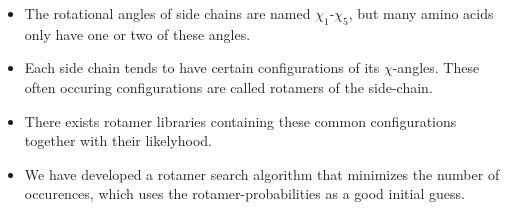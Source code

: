 \documentclass[a0,portrait]{a0poster}
\begin{document}
\begin{GridBlock}{51}{75}{48}
\begin{multicols}{2}
\begin{itemize}
\begin{minipage}{\linewidth}
\label{fig:lysine}
\end{minipage}

\item The rotational angles of side chains are named
  $\chi_1$-$\chi_5$, but many amino acids only have one or two of
  these angles.

\item Each side chain tends to have certain configurations of its
  $\chi$-angles. These often occuring configurations are called
  rotamers of the side-chain.

\item There exists rotamer libraries containing these common
  configurations together with their likelyhood.

\item We have developed a rotamer search algorithm that minimizes the
  number of occurences, which uses the rotamer-probabilities as a good
  initial guess.
\end{itemize}
\end{multicols}
\end{GridBlock}

\end{document}
